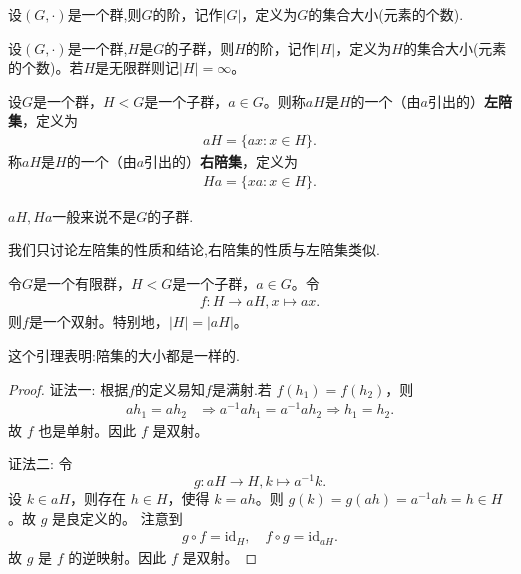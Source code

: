 \documentclass[../../main.tex]{subfiles}
\begin{document}
\begin{definition}[群的阶]
设$(G,\cdot)$是一个群,则$G$的阶，记作$|G|$，定义为$G$的集合大小(元素的个数).
\end{definition}

\begin{definition}[子群的阶]
设$(G,\cdot)$是一个群,$H$是$G$的子群，则$H$的阶，记作$|H|$，定义为$H$的集合大小(元素的个数)。若$H$是无限群则记$|H| = \infty$。
\end{definition}

\begin{definition}[左陪集]
设$G$是一个群，$H < G$是一个子群，$a \in G$。则称$aH$是$H$的一个（由$a$引出的）\textbf{左陪集}，定义为
\begin{align*}
aH = \{ax : x \in H\}.
\end{align*}
称$aH$是$H$的一个（由$a$引出的）\textbf{右陪集}，定义为
\begin{align*}
Ha = \{xa : x \in H\}.
\end{align*} 
\end{definition}
\begin{remark}
$aH,Ha$一般来说不是$G$的子群.

我们只讨论左陪集的性质和结论,右陪集的性质与左陪集类似.
\end{remark}

\begin{lemma}\label{lemma:陪集aH大小与H相同}
令$G$是一个有限群，$H < G$是一个子群，$a \in G$。令
\begin{align*}
f : H \to aH,x \mapsto ax.
\end{align*}
则$f$是一个双射。特别地，$|H| = |aH|$。 
\end{lemma}
\begin{note}
这个引理表明:陪集的大小都是一样的.
\end{note}
\begin{proof}
{\color{blue}证法一:}
根据$f$的定义易知$f$是满射.若 \(f(h_1) = f(h_2)\)，则
\begin{align*}
ah_1 = ah_2 &\Rightarrow a^{-1}ah_1 = a^{-1}ah_2 \Rightarrow h_1 = h_2.
\end{align*}
故 \(f\) 也是单射。因此 \(f\) 是双射。

{\color{blue}证法二:}
令
\[g: aH \rightarrow H, k \mapsto a^{-1}k.\]
设 \(k \in aH\)，则存在 \(h \in H\)，使得 \(k = ah\)。则 \(g(k) = g(ah) = a^{-1}ah = h \in H\)。故 \(g\) 是良定义的。
注意到
\begin{align*}
g \circ f = \mathrm{id}_H, \quad f \circ g = \mathrm{id}_{aH}.
\end{align*}
故 \(g\) 是 \(f\) 的逆映射。因此 \(f\) 是双射。 

\end{proof}
\end{document}

